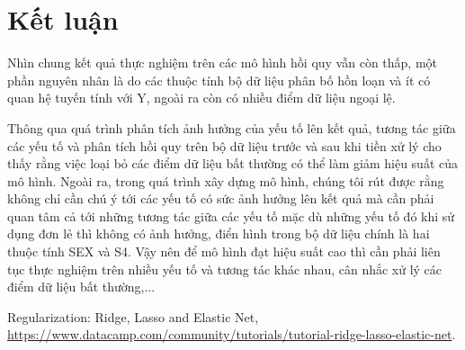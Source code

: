 \documentclass[runningheads]{llncs}
\begin{document}
\section{Kết luận}
Nhìn chung kết quả thực nghiệm trên các mô hình hồi quy vẫn còn thấp, một phần nguyên nhân là do các thuộc tính bộ dữ liệu phân bố hồn loạn và ít có quan hệ tuyến tính với Y, ngoài ra còn có nhiều điểm dữ liệu ngoại lệ.

Thông qua quá trình phân tích ảnh hưởng của yếu tố lên kết quả, tương tác giữa các yếu tố và phân tích hồi quy trên bộ dữ liệu trước và sau khi tiền xử lý cho thấy rằng việc loại bỏ các điểm dữ liệu bất thường có thể làm giảm hiệu suất của mô hình. Ngoài ra, trong quá trình xây dựng mô hình, chúng tôi rút được rằng  không chỉ cần chú ý tới các yếu tố có sức ảnh hưởng lên kết quả mà cần phải quan tâm cả tới những tương tác giữa các yếu tố mặc dù những yếu tố đó khi sử dụng đơn lẻ thì không có ảnh hưởng, điển hình trong bộ dữ liệu chính là hai thuộc tính SEX và S4. Vậy nên để mô hình đạt hiệu suất cao thì cần phải liên tục thực nghiệm trên nhiều yếu tố và tương tác khác nhau, cân nhắc xử lý các điểm dữ liệu bất thường,...

\begin{thebibliography}{5}
Regularization: Ridge, Lasso and Elastic Net, \url{https://www.datacamp.com/community/tutorials/tutorial-ridge-lasso-elastic-net}.
\end{thebibliography}
\end{document}
